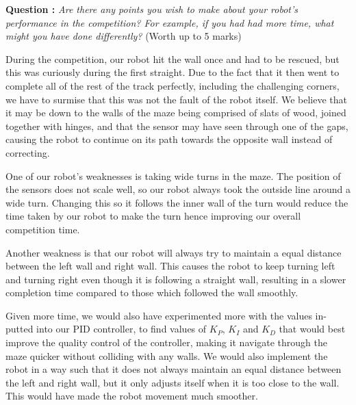 \documentclass[hidelinks,a4paper,11pt]{article}
\newcounter{question}
\newcommand\myq{\refstepcounter{question}\thequestion}
\begin{document}
{\bfseries Question \myq:}  \emph{Are there any points you wish to make about your robot's
performance in the competition?  For example, if you had had more time, what might you have done
differently?} (Worth up to 5 marks)\\
\begin{mdframed}
During the competition, our robot hit the wall once and had to be rescued, but this was curiously
during the first straight. Due to the fact that it then went to complete all of the rest of the
track perfectly, including the challenging corners, we have to surmise that this was not the fault
of the robot itself. We believe that it may be down to the walls of the maze being comprised of
slats of wood, joined together with hinges, and that the sensor may have seen through one of the
gaps, causing the robot to continue on its path towards the opposite wall instead of correcting.

One of our robot's weaknesses is taking wide turns in the maze. The position of the sensors does not
scale well, so our robot always took the outside line around a wide turn. Changing this so it
follows the inner wall of the turn would reduce the time taken by our robot to make the turn hence
improving our overall competition time.

Another weakness is that our robot will always try to maintain a equal distance between the left
wall and right wall. This causes the robot to keep turning left and turning right even though it is
following a straight wall, resulting in a slower completion time compared to those which followed
the wall smoothly.

Given more time, we would also have experimented more with the values in-putted into our PID
controller, to find values of $K_P$, $K_I$ and $K_D$ that would best improve the quality control of
the controller, making it navigate through the maze quicker without colliding with any walls. We
would also implement the robot in a way such that it does not always maintain an equal distance
between the left and right wall, but it only adjusts itself when it is too close to the wall. This
would have made the robot movement much smoother.
\end{mdframed}
\vspace*{\baselineskip}
\end{document}
